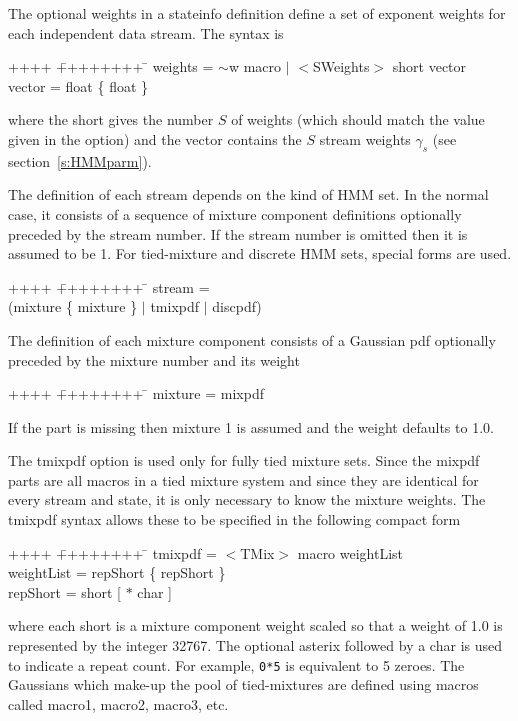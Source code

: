The optional {\sf weights} in a {\sf stateinfo} definition define
a set of exponent weights for each independent data stream.  The
syntax is
{\sf
\begin{tabbing}
++++ \= ++++++++ \=  \kill
\>   weights = \> $\sim$w macro $|$ $<$SWeights$>$ short vector \\
\>   vector  = \> float \{ float \} 
\end{tabbing}
}
\noindent
where the {\sf short} gives the number $S$ of weights (which should match the
value given in the  option) and the {\sf vector}
contains the $S$ stream weights $\gamma_s$ (see section~\ref{s:HMMparm}).

The definition of each  {\sf stream} 
depends on the kind of HMM set.  In the normal case, it
consists of a sequence of mixture
component
definitions optionally preceded by the stream number.  If the stream
number is omitted then it is assumed to be 1.  For tied-mixture
and discrete HMM sets, special forms are used.
{\sf
\begin{tabbing}
++++ \= ++++++++ \=  \kill
\>   stream =  \\
\>            \> (mixture \{ mixture \} $|$ tmixpdf $|$ discpdf)
\end{tabbing}
}

The definition of each mixture component consists of a Gaussian
pdf optionally preceded by the mixture number and its weight
{\sf
\begin{tabbing}
++++ \= ++++++++ \=  \kill
\>   mixture =  mixpdf
\end{tabbing}
}
\noindent
If the  part is missing then mixture 1 is assumed and the
weight defaults to 1.0. 

The {\sf tmixpdf} option is used only for fully 
tied mixture sets.  Since the {\sf mixpdf} parts are all macros in
a tied mixture system and since they are identical for every stream
and state, it is only necessary to know the mixture weights.  The
{\sf tmixpdf} syntax allows these to be specified in the following
compact form
{\sf
\begin{tabbing}
++++ \= ++++++++ \=  \kill
\>   tmixpdf = \> $<$TMix$>$ macro weightList \\
\>   weightList = \> repShort \{ repShort \} \\
\>   repShort = \> short [ $\ast$ char ]
\end{tabbing}
}
\noindent
where each {\sf short} is a mixture component weight scaled so that
a weight of 1.0 is represented by the integer 32767.  
The optional asterix 
followed by a {\sf char} is used to indicate
a repeat count.  For example, {\tt 0*5} is equivalent to 5 zeroes.
The Gaussians which make-up the pool of tied-mixtures are defined 
using   macros called
{\sf macro1}, {\sf macro2}, {\sf macro3}, etc. 

